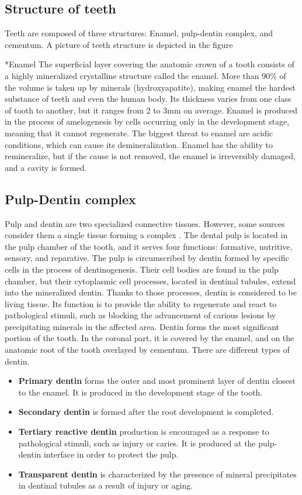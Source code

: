 \subsection{Structure of teeth}
Teeth are composed of three structures: Enamel, pulp-dentin complex, and cementum. A picture of teeth structure is depicted in the figure

    *{Enamel}
The superficial layer covering the anatomic crown of a tooth consists of a highly mineralized crystalline structure called the enamel. More than 90\% of the volume is taken up by minerals (hydroxyapatite), making enamel the hardest substance of teeth and even the human body. Its thickness varies from one class of tooth to another, but it ranges from 2 to 3mm on average. Enamel is produced in the process of amelogenesis by cells occurring only in the development stage, meaning that it cannot regenerate. The biggest threat to enamel are acidic conditions, which can cause its demineralization. Enamel has the ability to remineralize, but if the cause is not removed, the enamel is irreversibly damaged, and a cavity is formed.

\subsection*{Pulp-Dentin complex}
Pulp and dentin are two specialized connective tissues. However, some sources consider them a single tissue forming a complex \cite{2019a}.
The dental pulp is located in the pulp chamber of the tooth, and it serves four functions: formative, nutritive, sensory, and reparative.
The pulp is circumscribed by dentin formed by specific cells in the process of dentinogenesis. Their cell bodies are found in the pulp chamber, but their cytoplasmic cell processes, located in dentinal tubules, extend into the mineralized dentin. Thanks to those processes, dentin is considered to be living tissue. Its function is to provide the ability to regenerate and react to pathological stimuli, such as blocking the advancement of carious lesions by precipitating minerals in the affected area.
Dentin forms the most significant portion of the tooth. In the coronal part, it is covered by the enamel, and on the anatomic root of the tooth overlayed by cementum. There are different types of dentin.
\begin{itemize}
    \item \textbf{Primary dentin} forms the outer and most prominent layer of dentin closest to the enamel. It is produced in the development stage of the tooth.
    \item \textbf {Secondary dentin} is formed after the root development is completed.
    \item \textbf{Tertiary reactive dentin} production is encouraged as a response to pathological stimuli, such as injury or caries. It is produced at the pulp-dentin interface in order to protect the pulp.
    \item \textbf{Transparent dentin} is characterized by the presence of mineral precipitates in dentinal tubules as a result of injury or aging.
\end{itemize}


